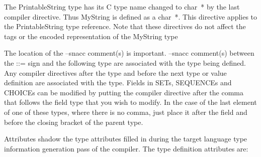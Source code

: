 The {\ASN PrintableString} type has its C type name changed to
{\C char~*} by the last compiler directive.  Thus {\ASN MyString} is defined
as a {\C char~*}.  This directive applies to the {\ASN PrintableString}
type reference.  Note that these directives do not affect the tags or
the encoded representation of the {\ASN MyString} type

The location of the {\ASN --snacc} comment(s) is important.
{\ASN --snacc} comment(s) between the {\ASN ::=} sign and the
following type are associated with the type being defined. Any
compiler directives after the type and before the next type or value
definition are associated with the type.  Fields in SETs, SEQUENCEs
and CHOICEs can be modified by putting the compiler directive after
the comma that follows the field type that you wish to modify.  In the
case of the last element of one of these types, where there is no
comma, just place it after the field and before the closing bracket of
the parent type.

Attributes shadow the type attributes filled in during the target
language type information generation pass of the compiler.  The type
definition attributes are:

